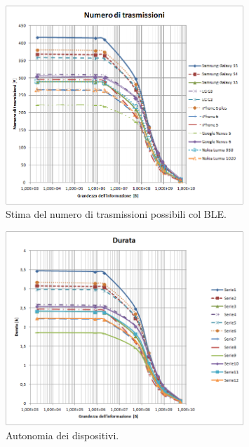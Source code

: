\begin{figure}[t]
	\centering
	\includegraphics[width=0.8\textwidth, keepaspectratio]{Images/studio_energetico/numero_trasmissioni}
	\caption[Stima del numero di trasmissioni possibili]{Stima del numero di trasmissioni possibili col BLE.}
	\label{fig:numero_trasmissioni}
\end{figure}
\begin{figure}[t]
	\centering
	\includegraphics[width=0.8\textwidth, keepaspectratio]{Images/studio_energetico/durata}
	\caption[Autonomia dei dispositivi]{Autonomia dei dispositivi.}
	\label{fig:durata}
\end{figure}